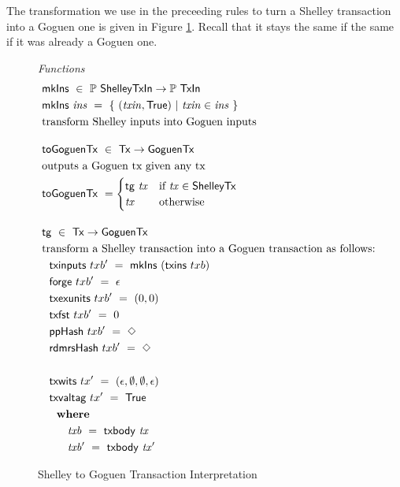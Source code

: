 The transformation we use in the preceeding rules to turn a Shelley
transaction into a Goguen one is given in Figure
\ref{fig:functions:to-shelley}. Recall that it stays the same if the same
if it was already a Goguen one.

\begin{figure}[htb]
  \emph{Functions}
  \begin{align*}
      & \fun{mkIns} ~\in~ \powerset{\ShelleyTxIn} \to \powerset{\TxIn}  \\
      & \fun{mkIns}~\var{ins} ~=~ \{~ (\var{txin}, \True) ~\vert~
      \var{txin} \in \var{ins}~\} \\
      & \text{transform Shelley inputs into Goguen inputs}
      \nextdef
      & \fun{toGoguenTx} ~\in~  \Tx \to \GoguenTx \\
      & \text{outputs a Goguen tx given any tx} \\
      & \fun{toGoguenTx} ~=
          \begin{cases}
           \fun{tg}~\var{tx}  & \text{if~} \var{tx} \in \ShelleyTx \\
                \var{tx} & \text{otherwise}
              \end{cases}
      \nextdef
      & \fun{tg} ~\in~  \Tx \to \GoguenTx \\
      & \text{transform a Shelley transaction into a Goguen transaction as follows:} \\
      & ~~\fun{txinputs}~{txb'} ~=~ \fun{mkIns}~(\fun{txins}~{txb}) \\
      & ~~\fun{forge}~{txb'} ~= ~\epsilon \\
      & ~~\fun{txexunits}~{txb'} ~= ~(0,0) \\
      & ~~\fun{txfst}~{txb'} ~= ~0 \\
      & ~~\fun{ppHash}~{txb'} ~= ~\Nothing \\
      & ~~\fun{rdmrsHash}~{txb'} ~= ~\Nothing \\~\\
      & ~~\fun{txwits}~{tx'} ~= ~(\epsilon,\emptyset,\emptyset,\epsilon) \\
      & ~~\fun{txvaltag}~{tx'} ~= ~\True \\
      &~~      \where \\
      & ~~~~~~~ \var{txb}~=~\txbody{tx} \\
      & ~~~~~~~ \var{txb'}~=~\txbody{tx'}
  \end{align*}
  \caption{Shelley to Goguen Transaction Interpretation}
  \label{fig:functions:to-shelley}
\end{figure}
